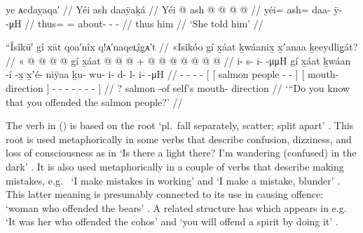\ex\label{ex:100-59-theyre-happy}%
%
\begingl
	\glpreamble	ye ᴀcdaỵaqa′ //
	\glpreamble	Yéi ash daaÿaḵá //
	\gla	Yéi @ ash @  @ {} @ {} @ {} //
	\glb	yéi= ash= daa- ÿ-  -μH //
	\glc	thus= = about- -  - //
	\gld	thus him  {} {} {} //
	\glft	‘She told him’
		//
\endgl
\xe

\ex\label{ex:100-60-do-you-know}%
%
\begingl
	\glpreamble	“Îsîkū′ gî xāt qoa′nîx q!ᴀ′naqeʟ̣îg̣ᴀ′t //
	\glpreamble	«\!Isikóo gí x̱áat ḵwáanix̱ x̱ʼanaa ḵeeydlig̱át? //
	\gla	«\! @ {} @ {} @ {} @ {} gí
		{} {} x̱áat  @ {} @ {} {}
			{} {}  @ {} {} +
			 @ {} @ {} @ {} @ {} @ {} @ {} @ {} {} //
	\glb	\pqp{}i- s- i-  -μμH gí
		{} {} x̱áat ḵwáan -í -x̱ {}
		{} {} x̱ʼé- niÿaa {}
		ḵu- wu- i- d- l- i-  -μH //
	\glc	\pqp{}- - -  - 
		{}[ {}[ salmon people - - {}]
			{}[  mouth- direction {}]
			- - - - - -  - {}] //
	\gld	\pqp{} {} {} {} {} ?
		{} {} salmon  {} -of {}
			{} self’s mouth- direction {}
			 {} {} {} {} {} {} {} //
	\glft	‘“Do you know that you offended the salmon people?’
		//
\endgl
\xe

The verb  in (\lastx) is based on the root  ‘pl.\ fall separately, scatter; split apart’ \parencite[f02/104–112]{leer:1973}.
This root is used metaphorically in some verbs that describe confusion, dizziness, and loss of consciousness as in  ‘Is there a light there?
I’m wandering (confused) in the dark’ \parencite[241]{story-naish:1973}.
It is also used metaphorically in a couple of verbs that describe making mistakes, e.g.\  ‘I make mistakes in working’ and  ‘I make a mistake, blunder’ \parencite[f02/110]{leer:1973}.
This latter meaning is presumably connected to its use in causing offence:  ‘woman who offended the bears’ \parencite[f02/112]{leer:1973}.
A related structure has  which appears in e.g.\  ‘It was her who offended the cohos’ \parencite[277.215]{dauenhauer:1990} and  ‘you will offend a spirit by doing it’ \parencite[f02/112]{leer:1973}.

